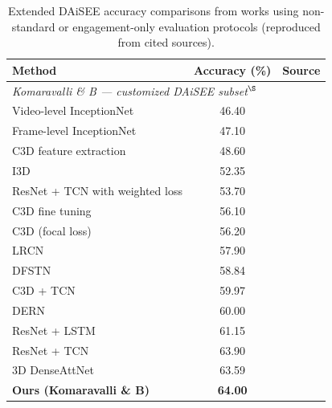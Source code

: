 \begin{table}[H]
\centering
\footnotesize
\caption{Extended \ac{DAiSEE} accuracy comparisons from works using non-standard or engagement-only evaluation protocols (reproduced from cited sources).}
\label{tab:fer_extended_compare}
\setlength{\tabcolsep}{6pt}
\begin{threeparttable}
\begin{tabular}{p{4.2cm} c p{3.2cm}}
\toprule
\textbf{Method} & \textbf{Accuracy (\%)} & \textbf{Source} \\
\midrule
\multicolumn{3}{l}{\textit{Komaravalli \& B \cite{komaravalli_detecting_2023} --- customized \ac{DAiSEE} subset$^{\S}$}} \\
Video-level InceptionNet              & 46.40 & \cite{komaravalli_detecting_2023} \\
Frame-level InceptionNet              & 47.10 & \cite{komaravalli_detecting_2023} \\
C3D feature extraction                & 48.60 & \cite{komaravalli_detecting_2023} \\
I3D                                   & 52.35 & \cite{komaravalli_detecting_2023} \\
ResNet + \ac{TCN} with weighted loss       & 53.70 & \cite{komaravalli_detecting_2023} \\
C3D fine tuning                       & 56.10 & \cite{komaravalli_detecting_2023} \\
C3D (focal loss)                      & 56.20 & \cite{komaravalli_detecting_2023} \\
LRCN                                  & 57.90 & \cite{komaravalli_detecting_2023} \\
DFSTN                                 & 58.84 & \cite{komaravalli_detecting_2023} \\
C3D + \ac{TCN}                             & 59.97 & \cite{komaravalli_detecting_2023} \\
DERN                                  & 60.00 & \cite{komaravalli_detecting_2023} \\
ResNet + \ac{LSTM}                         & 61.15 & \cite{komaravalli_detecting_2023} \\
ResNet + \ac{TCN}                          & 63.90 & \cite{komaravalli_detecting_2023} \\
3D DenseAttNet                        & 63.59 & \cite{komaravalli_detecting_2023} \\
\textbf{Ours (Komaravalli \& B)}      & \textbf{64.00} & \cite{komaravalli_detecting_2023} \\

\end{tabular}
\end{threeparttable}
\end{table}
